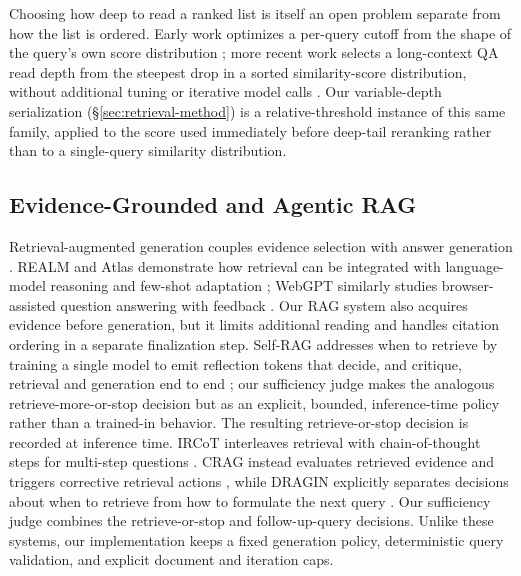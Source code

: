 Choosing how deep to read a ranked list is itself an open problem
separate from how the list is ordered. Early work optimizes a
per-query cutoff from the shape of the query's own score distribution
\citep{arampatzis2009stopreading}; more recent work selects a
long-context QA read depth from the steepest drop in a sorted
similarity-score distribution, without additional tuning or iterative
model calls \citep{taguchi2025adaptivek}. Our variable-depth
serialization (\S\ref{sec:retrieval-method}) is a relative-threshold
instance of this same family, applied to the score used immediately
before deep-tail reranking rather than to a single-query similarity
distribution.

\subsection{Evidence-Grounded and Agentic RAG}

Retrieval-augmented generation couples evidence selection with answer
generation \citep{lewis2020rag}. REALM and Atlas demonstrate how
retrieval can be integrated with language-model reasoning and few-shot
adaptation \citep{guu2020realm,izacard2023atlas}; WebGPT similarly
studies browser-assisted question answering with feedback
\citep{nakano2021webgpt}. Our RAG system also acquires evidence before
generation, but it limits additional reading and handles citation
ordering in a separate finalization step.
Self-RAG addresses when to retrieve by training a single model to emit
reflection tokens that decide, and critique, retrieval and generation
end to end \citep{asai2024selfrag}; our sufficiency judge makes the
analogous retrieve-more-or-stop decision but as an explicit, bounded,
inference-time policy rather than a trained-in behavior. The resulting
retrieve-or-stop decision is recorded at inference time. IRCoT
interleaves retrieval with chain-of-thought steps for multi-step
questions \citep{trivedi2023ircot}. CRAG instead evaluates retrieved
evidence and triggers corrective retrieval actions
\citep{yan2024crag}, while DRAGIN explicitly separates decisions about
when to retrieve from how to formulate the next query
\citep{su2024dragin}. Our sufficiency judge combines the
retrieve-or-stop and follow-up-query decisions. Unlike these systems,
our implementation keeps a fixed generation policy, deterministic
query validation, and explicit document and iteration caps.

